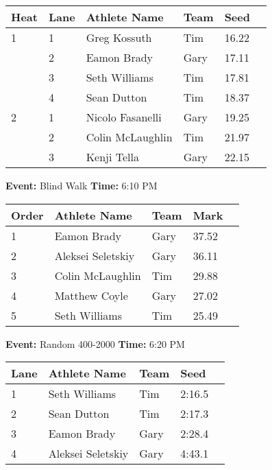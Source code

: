 \documentclass[10pt]{article}
\begin{document}
\vspace{1em}
\begin{tabular}{@{}llllll@{}}
\toprule
\textbf{{Heat}} &
\textbf{Lane} & \textbf{Athlete Name} & \textbf{Team} & \textbf{Seed} \\
\midrule
1 & 1 & Greg Kossuth & Tim & 16.22 &\\
 & 2 & Eamon Brady & Gary & 17.11 &\\
 & 3 & Seth Williams & Tim & 17.81 &\\
 & 4 & Sean Dutton & Tim & 18.37 &\\
2 & 1 & Nicolo Fasanelli & Gary & 19.25 &\\
 & 2 & Colin McLaughlin & Tim & 21.97 &\\
 & 3 & Kenji Tella & Gary & 22.15 &\\
\bottomrule
\end{tabular}
\vspace{2.5em}


\textbf{Event:} Blind Walk \quad \textbf{Time:} 6:10 PM 

\vspace{1em}
\begin{tabular}{@{}lllll@{}}
\toprule

\textbf{Order} & \textbf{Athlete Name} & \textbf{Team} & \textbf{Mark} \\
\midrule
1 & Eamon Brady & Gary & 37.52 &\\
2 & Aleksei Seletskiy & Gary & 36.11 &\\
3 & Colin McLaughlin & Tim & 29.88 &\\
4 & Matthew Coyle & Gary & 27.02 &\\
5 & Seth Williams & Tim & 25.49 &\\
\bottomrule
\end{tabular}
\vspace{2.5em}


\textbf{Event:} Random 400-2000 \quad \textbf{Time:} 6:20 PM 

\vspace{1em}
\begin{tabular}{@{}lllll@{}}
\toprule

\textbf{Lane} & \textbf{Athlete Name} & \textbf{Team} & \textbf{Seed} \\
\midrule
1 & Seth Williams & Tim & 2:16.5 &\\
2 & Sean Dutton & Tim & 2:17.3 &\\
3 & Eamon Brady & Gary & 2:28.4 &\\
4 & Aleksei Seletskiy & Gary & 4:43.1 &\\
\bottomrule
\end{tabular}
\vspace{2.5em}
\end{document}
